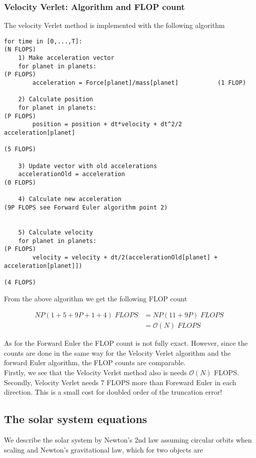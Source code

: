 \documentclass{article}
\begin{document}
\subsubsection{Velocity Verlet: Algorithm and FLOP count}

The velocity Verlet method is implemented with the following algorithm

\begin{lstlisting}
for time in [0,...,T]:														(N FLOPS)
	1) Make acceleration vector
	for planet in planets: 													(P FLOPS)
		acceleration = Force[planet]/mass[planet]			(1 FLOP)
					
	2) Calculate position
	for planet in planets: 													(P FLOPS)
		position = position + dt*velocity + dt^2/2 acceleration[planet]									
																					(5 FLOPS)
		
	3) Update vector with old accelerations
	accelerationOld = acceleration										(0 FLOPS)
	
	4) Calculate new acceleration 										(9P FLOPS see Forward Euler algorithm point 2)

		
	5) Calculate velocity
	for planet in planets:													(P FLOPS)
		velocity = velocity + dt/2(accelerationOld[planet] + acceleration[planet]])		  
																					(4 FLOPS)
\end{lstlisting}

From the above algorithm we get the following FLOP count

\begin{subequations}
	\begin{align}
	NP\left( 1+ 5 + 9P + 1 + 4\right)\;FLOPS &= NP(11 + 9P)\;FLOPS\\
	&= \mathcal{O}(N)\;FLOPS
	\end{align}
\end{subequations}


As for the Forward Euler the FLOP count is not fully exact. However, since the counts are done in the same way for the Velocity Verlet algorithm and the forward Euler algorithm, the FLOP counts are comparable. \\

Firstly, we see that the Velocity Verlet method also is needs $\mathcal{O}(N)$ FLOPS. Secondly, Velocity Verlet needs 7 FLOPS more than Foreward Euler in each direction. This is a small cost for doubled order of the truncation error! 


\subsection{The solar system equations}
We describe the solar system by Newton's 2nd law assuming circular orbits when scaling and Newton's gravitational law, which for two objects are
\end{document}

